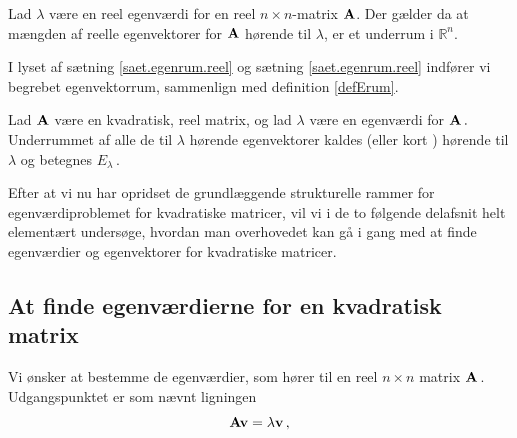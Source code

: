 \begin{theorem} \label{saet.egenrum.reel}
Lad $ \lambda $ være en reel egenværdi for en reel  $n\times n$-matrix  $ \mathbf{A} $. Der gælder da at mængden af reelle egenvektorer for $ \mathbf{A} $ hørende til $ \lambda $, er et underrum i $\mathbb R^n$. 
\end{theorem}

I lyset af sætning \ref{saet.egenrum.reel} og sætning \ref{saet.egenrum.reel} indfører vi begrebet egenvektorrum, sammenlign med definition \ref{defErum}.

\begin{definition}[Egenvektorrum]
Lad $\mathbf{A}$ være en kvadratisk, reel matrix, og lad $\lambda$ være en egenværdi for $\mathbf{A}\,.$\bs
Underrummet af alle de til $\lambda$ hørende egenvektorer kaldes  (eller kort ) hørende til $\lambda$ og betegnes $ E_\lambda\,. $
\end{definition}

Efter at vi nu har opridset de grundlæggende strukturelle rammer for egenværdiproblemet for kvadratiske matricer, vil vi i de to følgende delafsnit helt elementært undersøge, hvordan man overhovedet kan gå i gang med at finde egenværdier og egenvektorer for kvadratiske matricer.\bs
\subsection{At finde egenværdierne for en kvadratisk matrix}

Vi ønsker at bestemme de egenværdier, som hører til en reel $n\times n$ matrix $\mathbf{A}\,$. Udgangspunktet er som nævnt ligningen
\begin{equation}
\mathbf{A} \mathbf{v} = \lambda \mathbf{v} \,,
\end{equation}

